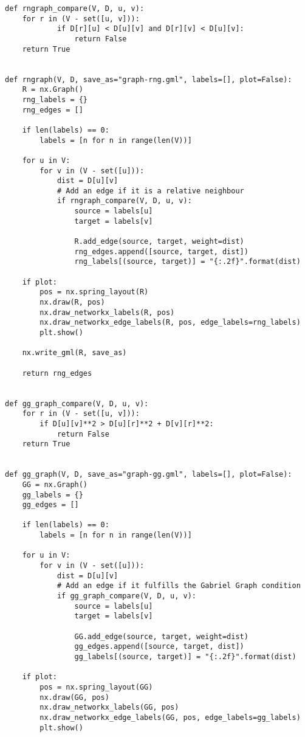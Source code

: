\documentclass[11pt, a4paper]{article}
\begin{document}
\begin{verbatim}
def rngraph_compare(V, D, u, v):
    for r in (V - set([u, v])):
            if D[r][u] < D[u][v] and D[r][v] < D[u][v]:
                return False
    return True


def rngraph(V, D, save_as="graph-rng.gml", labels=[], plot=False):
    R = nx.Graph()
    rng_labels = {}
    rng_edges = []
    
    if len(labels) == 0:
        labels = [n for n in range(len(V))]
    
    for u in V:
        for v in (V - set([u])):
            dist = D[u][v]
            # Add an edge if it is a relative neighbour
            if rngraph_compare(V, D, u, v):
                source = labels[u]
                target = labels[v]
                
                R.add_edge(source, target, weight=dist)
                rng_edges.append([source, target, dist])
                rng_labels[(source, target)] = "{:.2f}".format(dist)

    if plot:
        pos = nx.spring_layout(R)
        nx.draw(R, pos)
        nx.draw_networkx_labels(R, pos)
        nx.draw_networkx_edge_labels(R, pos, edge_labels=rng_labels)
        plt.show()
    
    nx.write_gml(R, save_as)
    
    return rng_edges
    
    
def gg_graph_compare(V, D, u, v):
    for r in (V - set([u, v])):
        if D[u][v]**2 > D[u][r]**2 + D[v][r]**2:
            return False
    return True


def gg_graph(V, D, save_as="graph-gg.gml", labels=[], plot=False):
    GG = nx.Graph()
    gg_labels = {}
    gg_edges = []
    
    if len(labels) == 0:
        labels = [n for n in range(len(V))]
    
    for u in V:
        for v in (V - set([u])):
            dist = D[u][v]
            # Add an edge if it fulfills the Gabriel Graph condition
            if gg_graph_compare(V, D, u, v):
                source = labels[u]
                target = labels[v]
                
                GG.add_edge(source, target, weight=dist)
                gg_edges.append([source, target, dist])
                gg_labels[(source, target)] = "{:.2f}".format(dist)

    if plot:
        pos = nx.spring_layout(GG)
        nx.draw(GG, pos)
        nx.draw_networkx_labels(GG, pos)
        nx.draw_networkx_edge_labels(GG, pos, edge_labels=gg_labels)
        plt.show()
    

\end{verbatim}
\end{document}
